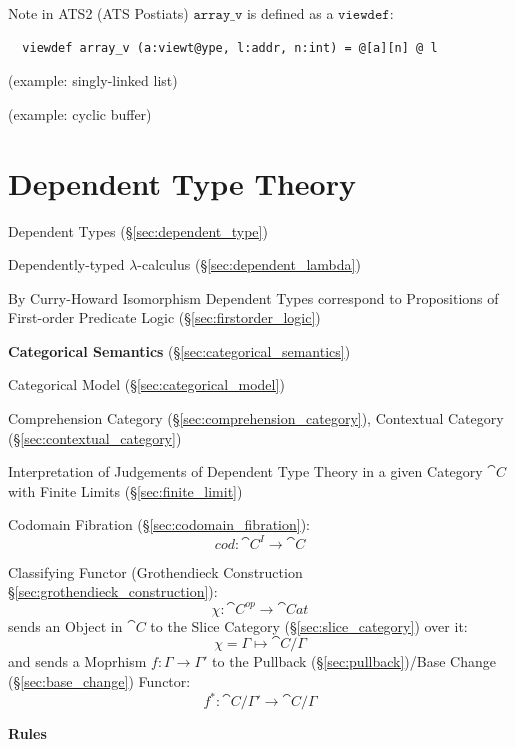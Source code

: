 \fist Note in ATS2 (ATS Postiats) $\mathtt{array\_v}$ is defined as a
$\mathtt{viewdef}$:
\begin{verbatim}
  viewdef array_v (a:viewt@ype, l:addr, n:int) = @[a][n] @ l
\end{verbatim}

(example: singly-linked list)

(example: cyclic buffer)



\endgroup



\section{Dependent Type Theory}\label{sec:dependent_type_theory}

Dependent Types (\S\ref{sec:dependent_type})

Dependently-typed $\lambda$-calculus (\S\ref{sec:dependent_lambda})

By Curry-Howard Isomorphism Dependent Types correspond to Propositions
of First-order Predicate Logic (\S\ref{sec:firstorder_logic})


\textbf{Categorical Semantics} (\S\ref{sec:categorical_semantics})

Categorical Model (\S\ref{sec:categorical_model})

Comprehension Category (\S\ref{sec:comprehension_category}),
Contextual Category (\S\ref{sec:contextual_category})

Interpretation of Judgements of Dependent Type Theory in a given
Category $\cat{C}$ with Finite Limits (\S\ref{sec:finite_limit})

Codomain Fibration (\S\ref{sec:codomain_fibration}):
\[
  cod:\cat{C}^I \rightarrow \cat{C}
\]

Classifying Functor (Grothendieck Construction
\S\ref{sec:grothendieck_construction}):
\[
  \chi : \cat{C}^{op} \rightarrow \cat{Cat}
\]
sends an Object in $\cat{C}$ to the Slice Category
(\S\ref{sec:slice_category}) over it:
\[
  \chi = \Gamma \mapsto \cat{C}/\Gamma
\]
and sends a Moprhism $f : \Gamma \rightarrow \Gamma'$ to the Pullback
(\S\ref{sec:pullback})/Base Change (\S\ref{sec:base_change}) Functor:
\[
  f^* : \cat{C}/\Gamma' \rightarrow \cat{C}/\Gamma
\]


\textbf{Rules}

